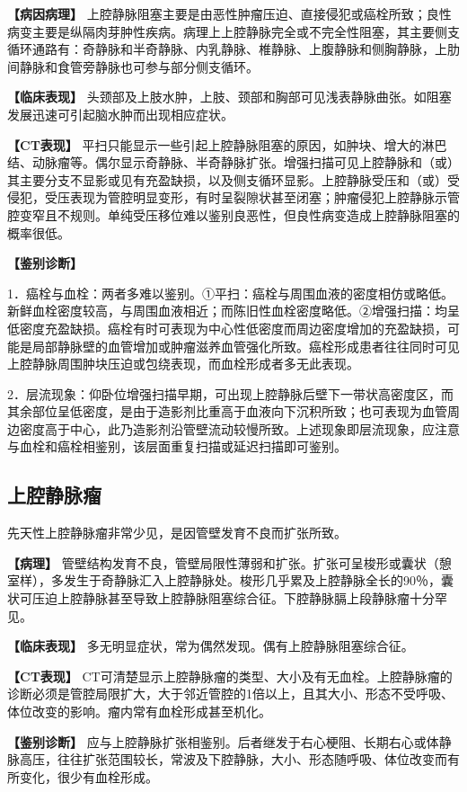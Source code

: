 \textbf{【病因病理】}
上腔静脉阻塞主要是由恶性肿瘤压迫、直接侵犯或癌栓所致；良性病变主要是纵隔肉芽肿性疾病。病理上上腔静脉完全或不完全性阻塞，其主要侧支循环通路有：奇静脉和半奇静脉、内乳静脉、椎静脉、上腹静脉和侧胸静脉，上肋间静脉和食管旁静脉也可参与部分侧支循环。

\textbf{【临床表现】}
头颈部及上肢水肿，上肢、颈部和胸部可见浅表静脉曲张。如阻塞发展迅速可引起脑水肿而出现相应症状。

\textbf{【CT表现】}
平扫只能显示一些引起上腔静脉阻塞的原因，如肿块、增大的淋巴结、动脉瘤等。偶尔显示奇静脉、半奇静脉扩张。增强扫描可见上腔静脉和（或）其主要分支不显影或见有充盈缺损，以及侧支循环显影。上腔静脉受压和（或）受侵犯，受压表现为管腔明显变形，有时呈裂隙状甚至闭塞；肿瘤侵犯上腔静脉示管腔变窄且不规则。单纯受压移位难以鉴别良恶性，但良性病变造成上腔静脉阻塞的概率很低。

\textbf{【鉴别诊断】}

1．癌栓与血栓：两者多难以鉴别。①平扫：癌栓与周围血液的密度相仿或略低。新鲜血栓密度较高，与周围血液相近；而陈旧性血栓密度略低。②增强扫描：均呈低密度充盈缺损。癌栓有时可表现为中心性低密度而周边密度增加的充盈缺损，可能是局部静脉壁的血管增加或肿瘤滋养血管强化所致。癌栓形成患者往往同时可见上腔静脉周围肿块压迫或包绕表现，而血栓形成者多无此表现。

2．层流现象：仰卧位增强扫描早期，可出现上腔静脉后壁下一带状高密度区，而其余部位呈低密度，是由于造影剂比重高于血液向下沉积所致；也可表现为血管周边密度高于中心，此乃造影剂沿管壁流动较慢所致。上述现象即层流现象，应注意与血栓和癌栓相鉴别，该层面重复扫描或延迟扫描即可鉴别。

\subsection{上腔静脉瘤}

先天性上腔静脉瘤非常少见，是因管壁发育不良而扩张所致。

\textbf{【病理】}
管壁结构发育不良，管壁局限性薄弱和扩张。扩张可呈梭形或囊状（憩室样），多发生于奇静脉汇入上腔静脉处。梭形几乎累及上腔静脉全长的90％，囊状可压迫上腔静脉甚至导致上腔静脉阻塞综合征。下腔静脉膈上段静脉瘤十分罕见。

\textbf{【临床表现】}
多无明显症状，常为偶然发现。偶有上腔静脉阻塞综合征。

\textbf{【CT表现】}
CT可清楚显示上腔静脉瘤的类型、大小及有无血栓。上腔静脉瘤的诊断必须是管腔局限扩大，大于邻近管腔的1倍以上，且其大小、形态不受呼吸、体位改变的影响。瘤内常有血栓形成甚至机化。

\textbf{【鉴别诊断】}
应与上腔静脉扩张相鉴别。后者继发于右心梗阻、长期右心或体静脉高压，往往扩张范围较长，常波及下腔静脉，大小、形态随呼吸、体位改变而有所变化，很少有血栓形成。

